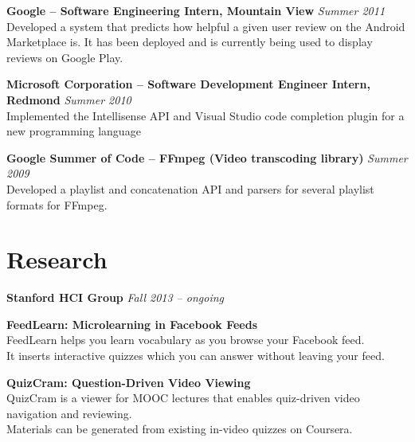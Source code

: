 \documentclass[margin,line]{resume}
\begin{document}
\begin{resume}
\textbf{Google -- Software Engineering Intern, Mountain View} \hfill \textsl{Summer 2011}\\
Developed a system that predicts how helpful a given user review on the Android Marketplace is. It has been deployed and is currently being used to display reviews on Google Play.

\textbf{Microsoft Corporation -- Software Development Engineer Intern, Redmond} \hfill \textsl{Summer 2010}\\
Implemented the Intellisense API and Visual Studio code completion plugin for a new programming language %

\textbf{Google Summer of Code -- FFmpeg (Video transcoding library)} \hfill \textsl{Summer 2009}\\
Developed a playlist and concatenation API and parsers for several playlist formats for FFmpeg.


\section{\mysidestyle Research}

\textbf{Stanford HCI Group} \hfill \textsl{Fall 2013 -- ongoing}

\textbf{FeedLearn: Microlearning in Facebook Feeds}\\ %
FeedLearn helps you learn vocabulary as you browse your Facebook feed.\\
It inserts interactive quizzes which you can answer without leaving your feed.

\textbf{QuizCram: Question-Driven Video Viewing}\\ %
QuizCram is a viewer for MOOC lectures that enables quiz-driven video navigation and reviewing.\\
Materials can be generated from existing in-video quizzes on Coursera.

%


\end{resume}
\end{document}
